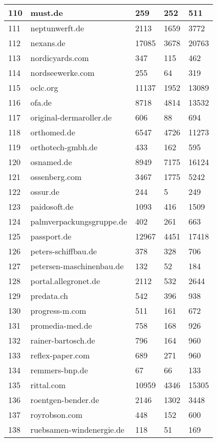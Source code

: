 \begin{longtable}{|m{0.5cm}|m{5cm}|m{2cm}|m{2cm}|m{2cm}|}
	\hline
	110 & must.de & 259 & 252 & 511\\
	\hline
	111 & neptunwerft.de & 2113 & 1659 & 3772\\
	\hline
	112 & nexans.de & 17085 & 3678 & 20763\\
	\hline
	113 & nordicyards.com & 347 & 115 & 462\\
	\hline
	114 & nordseewerke.com & 255 & 64 & 319\\
	\hline
	115 & oclc.org & 11137 & 1952 & 13089\\
	\hline
	116 & ofa.de & 8718 & 4814 & 13532\\
	\hline
	117 & original-dermaroller.de & 606 & 88 & 694\\
	\hline
	118 & orthomed.de & 6547 & 4726 & 11273\\
	\hline
	119 & orthotech-gmbh.de & 433 & 162 & 595\\
	\hline
	120 & osnamed.de & 8949 & 7175 & 16124\\
	\hline
	121 & ossenberg.com & 3467 & 1775 & 5242\\
	\hline
	122 & ossur.de & 244 & 5 & 249\\
	\hline
	123 & paidosoft.de & 1093 & 416 & 1509\\
	\hline
	124 & palmverpackungsgruppe.de & 402 & 261 & 663\\
	\hline
	125 & passport.de & 12967 & 4451 & 17418\\
	\hline
	126 & peters-schiffbau.de & 378 & 328 & 706\\
	\hline
	127 & petersen-maschinenbau.de & 132 & 52 & 184\\
	\hline
	128 & portal.allegronet.de & 2112 & 532 & 2644\\
	\hline
	129 & predata.ch & 542 & 396 & 938\\
	\hline
	130 & progress-m.com & 511 & 161 & 672\\
	\hline
	131 & promedia-med.de & 758 & 168 & 926\\
	\hline
	132 & rainer-bartosch.de & 796 & 164 & 960\\
	\hline
	133 & reflex-paper.com & 689 & 271 & 960\\
	\hline
	134 & remmers-bnp.de & 67 & 66 & 133\\
	\hline
	135 & rittal.com & 10959 & 4346 & 15305\\
	\hline
	136 & roentgen-bender.de & 2146 & 1302 & 3448\\
	\hline
	137 & royrobson.com & 448 & 152 & 600\\
	\hline
	138 & ruebsamen-windenergie.de & 118 & 51 & 169\\

\end{longtable}
